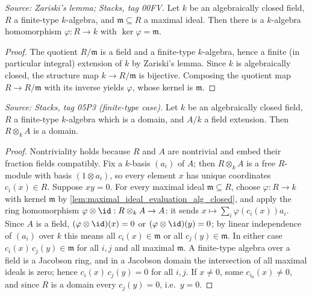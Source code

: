 \begin{lemma}\leanok
  \label{lem:maximal_ideal_evaluation_alg_closed}
  \textit{Source: Zariski's lemma; Stacks, tag 00FV.}
  Let \(k\) be an algebraically closed field, \(R\) a finite-type
  \(k\)-algebra, and \(\mathfrak m \subseteq R\) a maximal ideal. Then
  there is a \(k\)-algebra homomorphism \(\varphi : R \to k\) with
  \(\ker \varphi = \mathfrak m\).
\end{lemma}
\begin{proof}
  \leanok
  The quotient \(R/\mathfrak m\) is a field and a finite-type
  \(k\)-algebra, hence a finite (in particular integral) extension of
  \(k\) by Zariski's lemma. Since \(k\) is algebraically closed, the
  structure map \(k \to R/\mathfrak m\) is bijective. Composing the
  quotient map \(R \to R/\mathfrak m\) with its inverse yields
  \(\varphi\), whose kernel is \(\mathfrak m\).
\end{proof}

\begin{lemma}\leanok
  \label{lem:tensor_domain_finite_type_alg_closed}
  \textit{Source: Stacks, tag 05P3 (finite-type case).}
  Let \(k\) be an algebraically closed field, \(R\) a finite-type
  \(k\)-algebra which is a domain, and \(A/k\) a field extension. Then
  \(R \otimes_k A\) is a domain.
\end{lemma}
\begin{proof}
  \leanok
  Nontriviality holds because \(R\) and \(A\) are nontrivial and embed
  their fraction fields compatibly. Fix a \(k\)-basis \((a_i)\) of
  \(A\); then \(R \otimes_k A\) is a free \(R\)-module with basis
  \((1 \otimes a_i)\), so every element \(x\) has unique coordinates
  \(c_i(x) \in R\). Suppose \(x y = 0\). For every maximal ideal
  \(\mathfrak m \subseteq R\), choose
  \(\varphi : R \to k\) with kernel \(\mathfrak m\) by
  \cref{lem:maximal_ideal_evaluation_alg_closed}, and apply the ring
  homomorphism \(\varphi \otimes \id : R \otimes_k A \to A\): it sends
  \(x \mapsto \sum_i \varphi(c_i(x)) a_i\). Since \(A\) is a field,
  \((\varphi \otimes \id)(x) = 0\) or \((\varphi \otimes \id)(y) = 0\);
  by linear independence of \((a_i)\) over \(k\) this means all
  \(c_i(x) \in \mathfrak m\) or all \(c_j(y) \in \mathfrak m\). In
  either case \(c_i(x)\, c_j(y) \in \mathfrak m\) for all \(i, j\) and
  all maximal \(\mathfrak m\). A finite-type algebra over a field is a
  Jacobson ring, and in a Jacobson domain the intersection of all
  maximal ideals is zero; hence \(c_i(x)\, c_j(y) = 0\) for all
  \(i, j\). If \(x \neq 0\), some \(c_{i_0}(x) \neq 0\), and since
  \(R\) is a domain every \(c_j(y) = 0\), i.e.\ \(y = 0\).
\end{proof}

